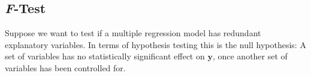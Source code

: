 


\subsection{\textit{F}-Test}\label{sec:Ftest}
Suppose we want to test if a multiple regression model has redundant explanatory variables.
In terms of hypothesis testing this is the null hypothesis: A set of variables has no statistically significant effect on $\textbf{y}$, once another set of variables has been controlled for.


